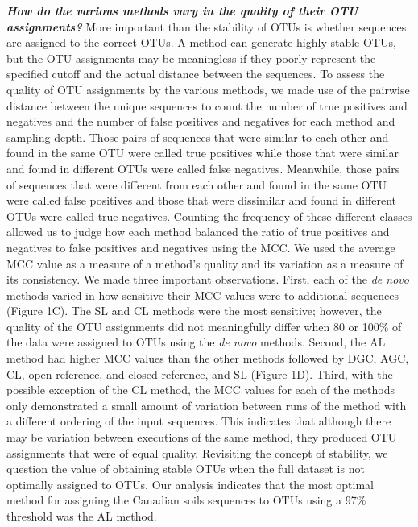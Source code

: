 \documentclass[11pt,]{article}
\begin{document}
\textbf{\emph{How do the various methods vary in the quality of their
OTU assignments?}} More important than the stability of OTUs is whether
sequences are assigned to the correct OTUs. A method can generate highly
stable OTUs, but the OTU assignments may be meaningless if they poorly
represent the specified cutoff and the actual distance between the
sequences. To assess the quality of OTU assignments by the various
methods, we made use of the pairwise distance between the unique
sequences to count the number of true positives and negatives and the
number of false positives and negatives for each method and sampling
depth. Those pairs of sequences that were similar to each other and
found in the same OTU were called true positives while those that were
similar and found in different OTUs were called false negatives.
Meanwhile, those pairs of sequences that were different from each other
and found in the same OTU were called false positives and those that
were dissimilar and found in different OTUs were called true negatives.
Counting the frequency of these different classes allowed us to judge
how each method balanced the ratio of true positives and negatives to
false positives and negatives using the MCC. We used the average MCC
value as a measure of a method's quality and its variation as a measure
of its consistency. We made three important observations. First, each of
the \emph{de novo} methods varied in how sensitive their MCC values were
to additional sequences (Figure 1C). The SL and CL methods were the most
sensitive; however, the quality of the OTU assignments did not
meaningfully differ when 80 or 100\% of the data were assigned to OTUs
using the \emph{de novo} methods. Second, the AL method had higher MCC
values than the other methods followed by DGC, AGC, CL, open-reference,
and closed-reference, and SL (Figure 1D). Third, with the possible
exception of the CL method, the MCC values for each of the methods only
demonstrated a small amount of variation between runs of the method with
a different ordering of the input sequences. This indicates that
although there may be variation between executions of the same method,
they produced OTU assignments that were of equal quality. Revisiting the
concept of stability, we question the value of obtaining stable OTUs
when the full dataset is not optimally assigned to OTUs. Our analysis
indicates that the most optimal method for assigning the Canadian soils
sequences to OTUs using a 97\% threshold was the AL method.
\end{document}
